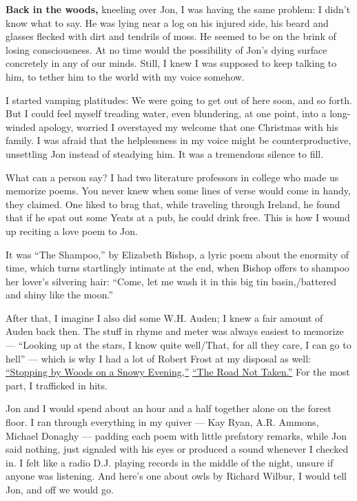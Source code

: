 \textbf{Back in the woods,} kneeling over Jon, I was having the same
problem: I didn't know what to say. He was lying near a log on his
injured side, his beard and glasses flecked with dirt and tendrils of
moss. He seemed to be on the brink of losing consciousness. At no time
would the possibility of Jon's dying surface concretely in any of our
minds. Still, I knew I was supposed to keep talking to him, to tether
him to the world with my voice somehow.

I started vamping platitudes: We were going to get out of here soon, and
so forth. But I could feel myself treading water, even blundering, at
one point, into a long-winded apology, worried I overstayed my welcome
that one Christmas with his family. I was afraid that the helplessness
in my voice might be counterproductive, unsettling Jon instead of
steadying him. It was a tremendous silence to fill.

What can a person say? I had two literature professors in college who
made us memorize poems. You never knew when some lines of verse would
come in handy, they claimed. One liked to brag that, while traveling
through Ireland, he found that if he spat out some Yeats at a pub, he
could drink free. This is how I wound up reciting a love poem to Jon.

It was ``The Shampoo,'' by Elizabeth Bishop, a lyric poem about the
enormity of time, which turns startlingly intimate at the end, when
Bishop offers to shampoo her lover's silvering hair: ``Come, let me wash
it in this big tin basin,/battered and shiny like the moon.''

After that, I imagine I also did some W.H. Auden; I knew a fair amount
of Auden back then. The stuff in rhyme and meter was always easiest to
memorize --- ``Looking up at the stars, I know quite well/That, for all
they care, I can go to hell'' --- which is why I had a lot of Robert
Frost at my disposal as well:
\href{https://www.poetryfoundation.org/poems/42891/stopping-by-woods-on-a-snowy-evening}{``Stopping
by Woods on a Snowy Evening,''}
\href{https://www.poetryfoundation.org/poems/44272/the-road-not-taken}{``The
Road Not Taken.''} For the most part, I trafficked in hits.

Jon and I would spend about an hour and a half together alone on the
forest floor. I ran through everything in my quiver --- Kay Ryan, A.R.
Ammons, Michael Donaghy --- padding each poem with little prefatory
remarks, while Jon said nothing, just signaled with his eyes or produced
a sound whenever I checked in. I felt like a radio D.J. playing records
in the middle of the night, unsure if anyone was listening. And here's
one about owls by Richard Wilbur, I would tell Jon, and off we would go.

